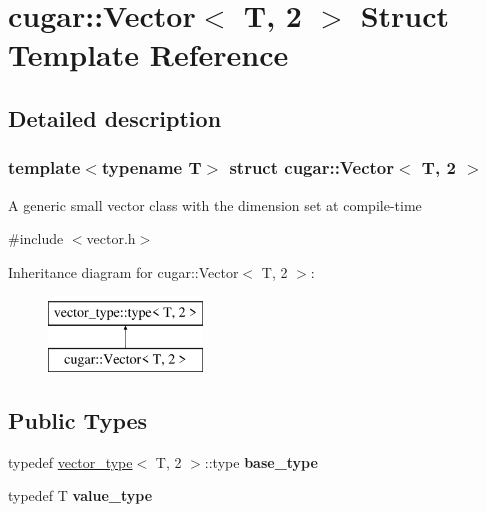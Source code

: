 \hypertarget{structcugar_1_1_vector_3_01_t_00_012_01_4}{}\section{cugar\+:\+:Vector$<$ T, 2 $>$ Struct Template Reference}
\label{structcugar_1_1_vector_3_01_t_00_012_01_4}


\subsection{Detailed description}
\subsubsection*{template$<$typename T$>$\newline
struct cugar\+::\+Vector$<$ T, 2 $>$}

A generic small vector class with the dimension set at compile-\/time 

{\ttfamily \#include $<$vector.\+h$>$}

Inheritance diagram for cugar\+:\+:Vector$<$ T, 2 $>$\+:\begin{figure}[H]
\begin{center}
\leavevmode
\includegraphics[height=2.000000cm]{structcugar_1_1_vector_3_01_t_00_012_01_4}
\end{center}
\end{figure}
\subsection*{Public Types}
\begin{DoxyCompactItemize}
\item 
\mbox{\label{structcugar_1_1_vector_3_01_t_00_012_01_4_a8c31eed689f57e3b47788539e45c8f2c}} 
typedef \hyperlink{structcugar_1_1vector__type}{vector\+\_\+type}$<$ T, 2 $>$\+::type {\bfseries base\+\_\+type}
\item 
\mbox{\label{structcugar_1_1_vector_3_01_t_00_012_01_4_a752c4b7daf9efbaafc52c63695474c04}} 
typedef T {\bfseries value\+\_\+type}
\end{DoxyCompactItemize}
